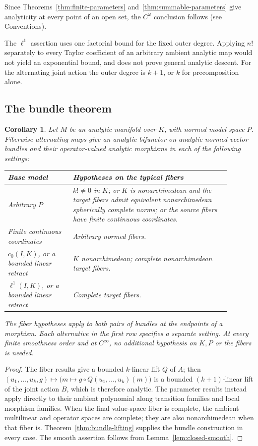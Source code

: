 \documentclass[11pt]{amsart}
\newtheorem{corollary}[theorem]{Corollary}
\theoremstyle{definition}
\theoremstyle{remark}
\numberwithin{equation}{section}
\begin{document}
Since Theorems~\ref{thm:finite-parameters} and~\ref{thm:summable-parameters} give analyticity at every point of an open set, the $C^\omega$ conclusion follows (see Conventions).

The $\ell^1$ assertion uses one factorial bound for the fixed outer degree. Applying $n!$ separately to every Taylor coefficient of an arbitrary ambient analytic map would not yield an exponential bound, and does not prove general analytic descent. For the alternating joint action the outer degree is $k+1$, or $k$ for precomposition alone.

\subsection{The bundle theorem}

\begin{corollary}\label{cor:bundle-cases}
Let $M$ be an analytic manifold over $K$, with normed model space $P$. Fiberwise alternating maps give an analytic bifunctor on analytic normed vector bundles and their operator-valued analytic morphisms in each of the following settings:
\begin{center}
\begin{tabular}{p{0.26\linewidth}p{0.63\linewidth}}
\hline
Base model & Hypotheses on the typical fibers\\
\hline
Arbitrary $P$ & $k!\ne0$ in $K$; or $K$ is nonarchimedean and the target fibers admit equivalent nonarchimedean spherically complete norms; or the source fibers have finite continuous coordinates.\\[3pt]
Finite continuous coordinates & Arbitrary normed fibers.\\[3pt]
$c_0(I,K)$, or a bounded linear retract & $K$ nonarchimedean; complete nonarchimedean target fibers.\\[3pt]
$\ell^1(I,K)$, or a bounded linear retract & Complete target fibers.\\
\hline
\end{tabular}
\end{center}
The fiber hypotheses apply to both pairs of bundles at the endpoints of a morphism. Each alternative in the first row specifies a separate setting. At every finite smoothness order and at $C^\infty$, no additional hypothesis on $K,P$ or the fibers is needed.
\end{corollary}
\begin{proof}
The fiber results give a bounded $k$-linear lift $Q$ of $A$; then $(u_1,\ldots,u_k,g)\mapsto\bigl(m\mapsto g\circ Q(u_1,\ldots,u_k)(m)\bigr)$ is a bounded $(k+1)$-linear lift of the joint action $B$, which is therefore analytic. The parameter results instead apply directly to their ambient polynomial along transition families and local morphism families. When the final value-space fiber is complete, the ambient multilinear and operator spaces are complete; they are also nonarchimedean when that fiber is. Theorem~\ref{thm:bundle-lifting} supplies the bundle construction in every case. The smooth assertion follows from Lemma~\ref{lem:closed-smooth}.
\end{proof}
\end{document}
